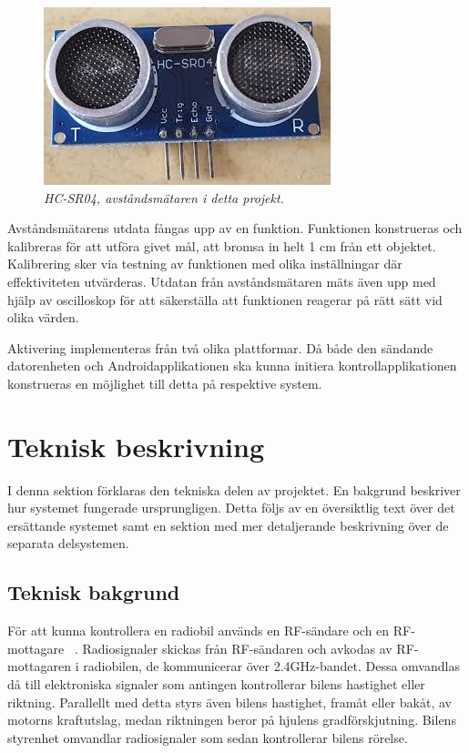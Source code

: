 \documentclass[a4paper]{article}
\begin{document}
\begin{figure}[H]
\includegraphics[scale=0.6]{DistanceMeasurementFront.jpg}
\centering
\caption{\it HC-SR04, avståndsmätaren i detta projekt.}
\end{figure} 


\noindent
Avståndsmätarens utdata fångas upp av en funktion. Funktionen konstrueras och kalibreras för att utföra givet mål, att bromsa in helt 1 cm från ett objektet. Kalibrering sker via testning av funktionen med olika inställningar där effektiviteten utvärderas. Utdatan från avståndsmätaren mäts även upp med hjälp av oscilloskop för att säkerställa att funktionen reagerar på rätt sätt vid olika värden.


\vspace{5mm} \noindent
Aktivering implementeras från två olika plattformar. Då både den sändande datorenheten och Androidapplikationen ska kunna initiera kontrollapplikationen konstrueras en möjlighet till detta på respektive system. %


\newpage
\section{Teknisk beskrivning}
I denna sektion förklaras den tekniska delen av projektet. En bakgrund beskriver hur systemet fungerade ursprungligen. Detta följs av en översiktlig text över det ersättande systemet samt en sektion med mer detaljerande beskrivning över de separata delsystemen.


\subsection{Teknisk bakgrund}
För att kunna kontrollera en radiobil används en RF-sändare och en RF-mottagare ~\cite{RCTechnique}. Radiosignaler skickas från RF-sändaren och avkodas av RF-mottagaren i radiobilen, de kommunicerar över 2.4GHz-bandet. Dessa omvandlas då till elektroniska signaler som antingen kontrollerar bilens hastighet eller riktning. Parallellt med detta styrs även bilens hastighet, framåt eller bakåt, av motorns kraftutslag, medan riktningen beror på hjulens gradförskjutning. Bilens styrenhet omvandlar radiosignaler som sedan kontrollerar bilens rörelse.
\end{document}
